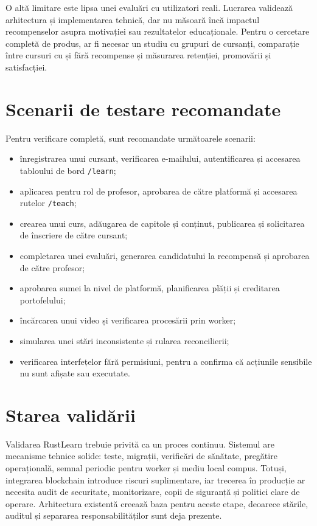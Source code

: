 O altă limitare este lipsa unei evaluări cu utilizatori reali. Lucrarea validează arhitectura și implementarea tehnică, dar nu măsoară încă impactul recompenselor asupra motivației sau rezultatelor educaționale. Pentru o cercetare completă de produs, ar fi necesar un studiu cu grupuri de cursanți, comparație între cursuri cu și fără recompense și măsurarea retenției, promovării și satisfacției.

\section{Scenarii de testare recomandate}
Pentru verificare completă, sunt recomandate următoarele scenarii:

\begin{itemize}[leftmargin=1.4cm]
    \item înregistrarea unui cursant, verificarea e-mailului, autentificarea și accesarea tabloului de bord \texttt{/learn};
    \item aplicarea pentru rol de profesor, aprobarea de către platformă și accesarea rutelor \texttt{/teach};
    \item crearea unui curs, adăugarea de capitole și conținut, publicarea și solicitarea de înscriere de către cursant;
    \item completarea unei evaluări, generarea candidatului la recompensă și aprobarea de către profesor;
    \item aprobarea sumei la nivel de platformă, planificarea plății și creditarea portofelului;
    \item încărcarea unui video și verificarea procesării prin worker;
    \item simularea unei stări inconsistente și rularea reconcilierii;
    \item verificarea interfețelor fără permisiuni, pentru a confirma că acțiunile sensibile nu sunt afișate sau executate.
\end{itemize}



\section{Starea validării}
Validarea RustLearn trebuie privită ca un proces continuu. Sistemul are mecanisme tehnice solide: teste, migrații, verificări de sănătate, pregătire operațională, semnal periodic pentru worker și mediu local compus. Totuși, integrarea blockchain introduce riscuri suplimentare, iar trecerea în producție ar necesita audit de securitate, monitorizare, copii de siguranță și politici clare de operare. Arhitectura existentă creează baza pentru aceste etape, deoarece stările, auditul și separarea responsabilităților sunt deja prezente.
